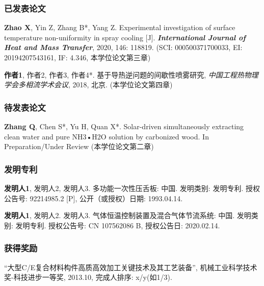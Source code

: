 \begin{achievements}

\subsubsection*{\textbf{已发表论文}}
\begin{enumerate}[label={[\arabic*]},itemsep=0pt,topsep=0pt]
\item\textbf{Zhao X}, Yin Z, Zhang B*, Yang Z. Experimental investigation of surface temperature non-uniformity in spray cooling [J]. \textbf{\textsl{International Journal of Heat and Mass Transfer}}, 2020, 146: 118819. (SCI: 000500371700033, EI: 20194207543161, IF: 4.346, 本学位论文第三章) 
\item\textbf{作者1}, 作者2, 作者3, 作者4*. 基于导热逆问题的间歇性喷雾研究, \textit{中国工程热物理学会多相流学术会议}, 2018, 北京. (本学位论文第四章)
\end{enumerate}

\medskip{}

\subsubsection*{\textbf{待发表论文}}
\begin{enumerate}[label={[\arabic*]},itemsep=0pt,topsep=0pt]
\item\textbf{Zhang Q}, Chen S*, Yu H, Quan X*. Solar-driven simultaneously extracting clean water and pure NH3•H2O solution by carbonized wood. In Preparation/Under Review (本学位论文第二章)
\end{enumerate}

\medskip{}

\subsubsection*{\textbf{发明专利}}
\begin{enumerate}[label={[\arabic*]},itemsep=0pt,topsep=0pt]
\item\textbf{发明人1}, 发明人2, 发明人3. 多功能一次性压舌板: 中国. 发明类别: 发明专利. 授权公告号: 92214985.2 [P], 公开（或授权）日期: 1993.04.14.
\item\textbf{发明人1}, 发明人2. 发明人3. 气体恒温控制装置及混合气体节流系统: 中国. 发明类别: 发明专利. 授权公告号: CN 107562086 B, 授权公告日: 2020.02.14.
\end{enumerate}	

\medskip{}

\subsubsection*{\textbf{获得奖励}}
\begin{enumerate}[label={[\arabic*]},itemsep=0pt,topsep=0pt]
\item “大型C/E复合材料构件高质高效加工关键技术及其工艺装备”, 机械工业科学技术奖-科技进步一等奖, 2013.10, 完成人排序: x/y(如1/3).
\end{enumerate}


\end{achievements}
